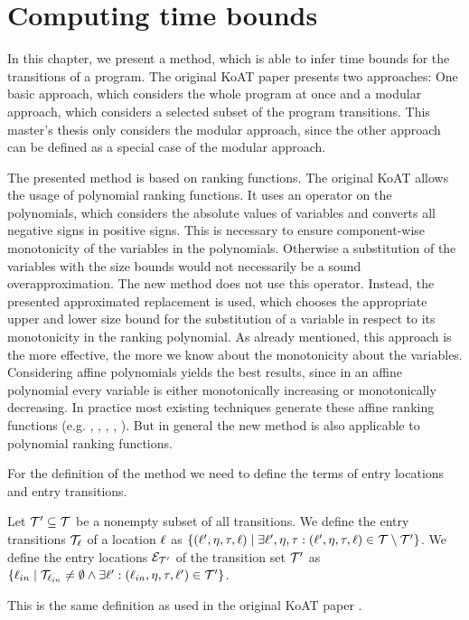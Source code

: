 \section{Computing time bounds}

In this chapter, we present a method, which is able to infer time bounds for the transitions of a program.
The original KoAT paper \cite{koat} presents two approaches: One basic approach, which considers the whole program at once and a modular approach, which considers a selected subset of the program transitions.
This master's thesis only considers the modular approach, since the other approach can be defined as a special case of the modular approach.

The presented method is based on ranking functions.
The original KoAT allows the usage of polynomial ranking functions.
It uses an operator on the polynomials, which considers the absolute values of variables and converts all negative signs in positive signs.
This is necessary to ensure component-wise monotonicity of the variables in the polynomials.
Otherwise a substitution of the variables with the size bounds would not necessarily be a sound overapproximation.
The new method does not use this operator.
Instead, the presented approximated replacement is used, which chooses the appropriate upper and lower size bound for the substitution of a variable in respect to its monotonicity in the ranking polynomial.
As already mentioned, this approach is the more effective, the more we know about the monotonicity about the variables.
Considering affine polynomials yields the best results, since in an affine polynomial every variable is either monotonically increasing or monotonically decreasing.
In practice most existing techniques generate these affine ranking functions (e.g. \cite{podelski2004prf}, \cite{bradley2005linear}, \cite{bagnara2012new}, \cite{leike2014ranking}, \cite{ben2013linear}).
But in general the new method is also applicable to polynomial ranking functions.

For the definition of the method we need to define the terms of entry locations and entry transitions.
\begin{definition}
  Let $\mathcal{T}' \subseteq \mathcal{T}$ be a nonempty subset of all transitions.
  We define the entry transitions $\mathcal{T}_{\ell}$ of a location $\ell$ as $\lbrace (\ell', \eta, \tau, \ell) \mid \exists \ell', \eta, \tau: (\ell', \eta, \tau, \ell) \in \mathcal{T} \setminus \mathcal{T}' \rbrace$.
  We define the entry locations $\mathcal{E}_{\mathcal{T}'}$ of the transition set $\mathcal{T}'$ as $\lbrace \ell_{in} \mid \mathcal{T}_{\ell_{in}} \neq \emptyset \wedge \exists \ell': (\ell_{in}, \eta, \tau, \ell') \in \mathcal{T}' \rbrace$.
\end{definition}
This is the same definition as used in the original KoAT paper \cite{koat}.

